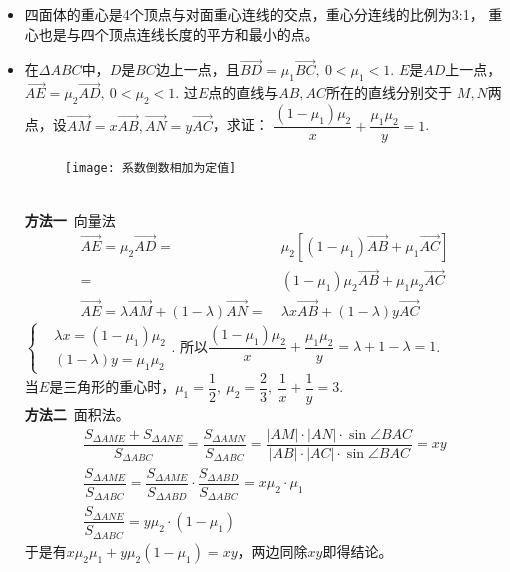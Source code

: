 \begin{itemize}[leftmargin=\inteval{\myitemleftmargin}pt,itemsep=
   \inteval{\myitemitempsep}pt,topsep=\inteval{\myitemtopsep}pt]
\item 四面体的重心是4个顶点与对面重心连线的交点，重心分连线的比例为3:1，
重心也是与四个顶点连线长度的平方和最小的点。

\item 在$ \Delta ABC $中，$ D $是$ BC $边上一点，且$ \vec{BD}=\mu_1
\vec{BC},\ 0<\mu_1<1 $. $ E $是$ AD $上一点，$ \vec{AE} =
\mu_2\vec{AD},\ 0<\mu_2<1 $. 过$ E $点的直线与$ AB,AC $所在的直线分别交于
$ M,N $两点，设$ \vec{AM}=x\vec{AB},\vec{AN}=
y\vec{AC} $，求证：
$ \dfrac{(1-\mu_1)\mu_2}{x}+\dfrac{\mu_1\mu_2}{y}=1 $. 
\begin{figure}[h]
    \centering
    \texttt{[image: 系数倒数相加为定值]}
\end{figure} \\
\textbf{方法一}\ 向量法
\begin{align*}
    \vec{AE} =\mu_2\vec{AD} =&\ \mu_2\left[
    (1-\mu_1)\vec{AB}+\mu_1\vec{AC}\right]\\
    =&\ (1-\mu_1)\mu_2\vec{AB}+\mu_1\mu_2\vec{AC} \\
    \vec{AE}=\lambda\vec{AM}+(1-\lambda)
    \vec{AN}=&\ \lambda x\vec{AB}+(1-\lambda)y
    \vec{AC}
\end{align*}
$ \left\{ 
\begin{aligned}
    &\lambda x = (1-\mu_1)\mu_2 \\
    &(1-\lambda)y = \mu_1\mu_2
\end{aligned} \right. $. 所以$ \dfrac{(1-\mu_1)\mu_2}{x}+\dfrac{\mu_1\mu_2}{y}
=\lambda+1-\lambda=1 $. \\
当$ E $是三角形的重心时，$ \mu_1=\dfrac{1}{2},\ \mu_2=\dfrac{2}{3},\ 
\dfrac{1}{x}+\dfrac{1}{y}=3 $. \\
\textbf{方法二}\ 面积法。
\begin{gather*}
    \dfrac{S_{\Delta AME}+S_{\Delta ANE}}{S_{\Delta ABC}}=
    \dfrac{S_{\Delta AMN}}{S_{\Delta ABC}}=\dfrac{|AM|\cdot 
    |AN|\cdot\sin\angle BAC}
    {|AB|\cdot |AC|\cdot\sin\angle BAC}=xy \\
    \dfrac{S_{\Delta AME}}{S_{\Delta ABC}}=\dfrac{S_{\Delta AME}}
    {S_{\Delta ABD}}\cdot \dfrac{S_{\Delta ABD}}{S_{\Delta ABC}}=x\mu_2\cdot\mu_1 \\
    \dfrac{S_{\Delta ANE}}{S_{\Delta ABC}}=y\mu_2\cdot(1-\mu_1)
\end{gather*}
于是有$ x\mu_2\mu_1+y\mu_2(1-\mu_1)=xy $，两边同除$ xy $即得结论。


\end{itemize}
